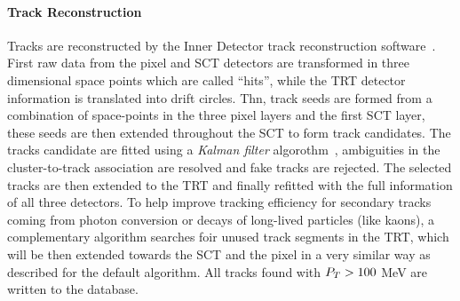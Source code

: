 \paragraph{Track Reconstruction}
Tracks are reconstructed  by the Inner Detector track reconstruction software~\cite{IDtracking}.
First raw data from the pixel and SCT detectors are transformed in three dimensional space points 
which are called ``hits'', while the  TRT detector information is translated into drift circles. 
Thn, track seeds are formed from a combination of space-points in the three pixel layers and the first SCT layer, these
seeds are then extended throughout the SCT to form track candidates. The tracks candidate are fitted 
using a \emph{Kalman filter} algorothm~\cite{Kalman}, ambiguities in the cluster-to-track association are resolved
and fake tracks are rejected. The selected tracks are then extended to the TRT and finally refitted with the full information of all three
detectors. To help improve tracking efficiency for secondary tracks coming from photon conversion or decays of long-lived 
particles (like kaons), a complementary algorithm searches foir unused track segments in the TRT, which will be then extended
towards the SCT and the pixel in a very similar way as described for the default algorithm.
All tracks found with $P_{T} > 100$ MeV are written to the database.

